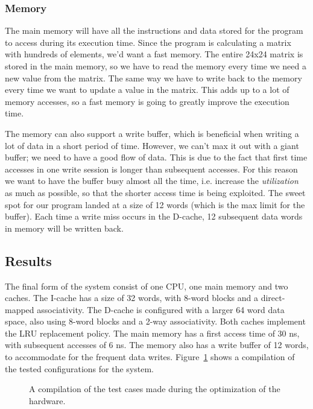 \documentclass[a4paper,9pt,fleqn]{article}
\begin{document}
\subsubsection{Memory}
The main memory will have all the instructions and data stored for the program to access during its 
execution time. Since the program is calculating a matrix with hundreds of elements, we'd want a fast 
memory. The entire 24x24 matrix is stored in the main memory, so we have to read the memory every 
time we need a new value from the matrix. The same way we have to write back to the memory every 
time we want to update a value in the matrix. This adds up to a lot of memory accesses, so a fast memory 
is going to greatly improve the execution time. 

The memory can also support a write buffer, which is beneficial when writing a lot of data in a short period 
of time. However, we can't max it out with a giant buffer; we need to have a good flow of data. This is due 
to the fact that first time accesses in one write session is longer than subsequent accesses. For this 
reason we want to have the buffer busy almost all the time, i.e. increase the {\it utilization} as much as 
possible, so that the shorter access time is being exploited. The sweet spot for our program landed at a 
size of 12 words (which is the max limit for the buffer). Each time a write miss occurs in the D-cache, 12
subsequent data words in memory will be written back.

\subsection{Results}
The final form of the system consist of one CPU, one main memory and two caches. The I-cache has a
size of 32 words, with 8-word blocks and a direct-mapped associativity. The D-cache is configured with a 
larger 64 word data space, also using 8-word blocks and a 2-way associativity. Both caches 
implement the LRU replacement policy. The main memory has a first access time of 30 ns, with 
subsequent accesses of 6 ns. The memory also has a write buffer of 12 words, to accommodate for the 
frequent data writes. Figure~\ref{specs} shows a compilation of the tested configurations
for the system. 

\begin{figure}
	\vspace*{-3.5cm}
	\begin{center}
	\end{center}
	\label{specs}
	\caption{A compilation of the test cases made during the optimization of the hardware.}
\end{figure}
\end{document}
